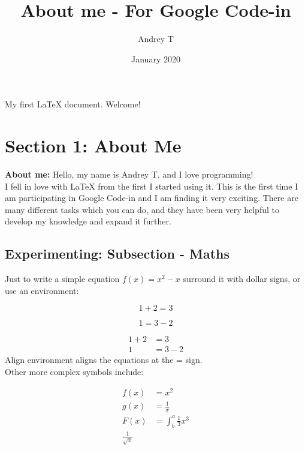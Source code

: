 \documentclass{article}
\title{About me - For Google Code-in}
\date{January 2020}
\author{Andrey T}
\begin{document}
\maketitle
 
\centering My first \LaTeX{} document. Welcome!

\newpage
{} %

\tableofcontents  %
\newpage

\section{Section 1: About Me}
\textbf{About me:} Hello, my name is Andrey T. and I love programming!\\
\vspace{10px}
I fell in love with \LaTeX{} from the first I started using it. This is the first time I am participating in Google Code-in and I am finding it very exciting. There are many different tasks which you can do, and they have been very helpful to develop my knowledge and expand it further.

\subsection{Experimenting: Subsection - Maths}

Just to write a simple equation $f(x) = x^2 - x$ surround it with dollar signs, 
or use an environment:

\begin{equation*}
  1 + 2 = 3 
\end{equation*}

\begin{equation*}
  1 = 3 - 2
\end{equation*}

\begin{align*}
  1 + 2 &= 3\\
  1 &= 3 - 2
\end{align*}
Align environment aligns the equations at the = sign.\\ %
 Other more complex symbols include:   %

\begin{align*}
  f(x) &= x^2\\
  g(x) &= \frac{1}{x}\\
  F(x) &= \int^a_b \frac{1}{3}x^3\\
  \frac{1}{\sqrt{x}}
\end{align*}
\end{document}
